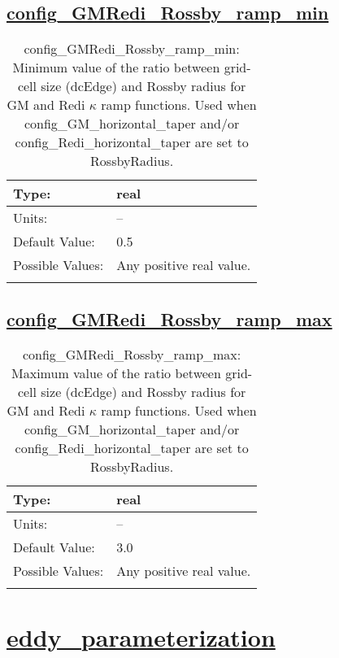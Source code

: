 \subsection[config\_GMRedi\_Rossby\_ramp\_min]{\hyperref[sec:nm_tab_GM_eddy_parameterization]{config\_GMRedi\_Rossby\_ramp\_min}}
\label{subsec:nm_sec_config_GMRedi_Rossby_ramp_min}
\begin{center}
\begin{longtable}{| p{2.0in} || p{4.0in} |}
    \hline
    Type: & real \\
    \hline
    Units: & -- \\
    \hline
    Default Value: & 0.5 \\
    \hline
    Possible Values: & Any positive real value. \\
    \hline
    \caption{config\_GMRedi\_Rossby\_ramp\_min: Minimum value of the ratio between grid-cell size (dcEdge) and Rossby radius for GM and Redi $\kappa$ ramp functions. Used when config\_GM\_horizontal\_taper and/or config\_Redi\_horizontal\_taper are set to RossbyRadius.}
\end{longtable}
\end{center}
\subsection[config\_GMRedi\_Rossby\_ramp\_max]{\hyperref[sec:nm_tab_GM_eddy_parameterization]{config\_GMRedi\_Rossby\_ramp\_max}}
\label{subsec:nm_sec_config_GMRedi_Rossby_ramp_max}
\begin{center}
\begin{longtable}{| p{2.0in} || p{4.0in} |}
    \hline
    Type: & real \\
    \hline
    Units: & -- \\
    \hline
    Default Value: & 3.0 \\
    \hline
    Possible Values: & Any positive real value. \\
    \hline
    \caption{config\_GMRedi\_Rossby\_ramp\_max: Maximum value of the ratio between grid-cell size (dcEdge) and Rossby radius for GM and Redi $\kappa$ ramp functions. Used when config\_GM\_horizontal\_taper and/or config\_Redi\_horizontal\_taper are set to RossbyRadius.}
\end{longtable}
\end{center}
\section[eddy\_parameterization]{\hyperref[sec:nm_tab_eddy_parameterization]{eddy\_parameterization}}
\label{sec:nm_sec_eddy_parameterization}
